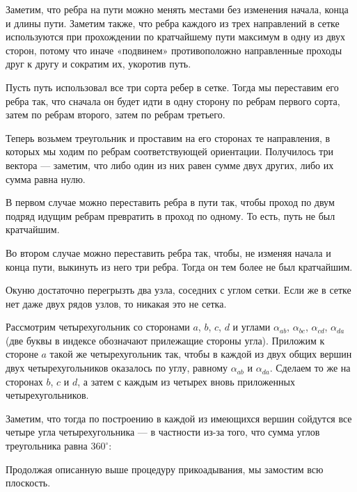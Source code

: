 ﻿
\begin{itemize}

\itA Заметим, что ребра на пути можно менять местами без изменения начала, конца и длины пути. Заметим также, что ребра каждого из трех направлений в сетке используются при прохождении по кратчайшему пути максимум в одну из двух сторон, потому что иначе «подвинем» противоположно направленные проходы друг к другу и сократим их, укоротив путь.

Пусть путь использовал все три сорта ребер в сетке. Тогда мы переставим его ребра так, что сначала он будет идти в одну сторону по ребрам первого сорта, затем по ребрам второго, затем по ребрам третьего.

Теперь возьмем треугольник и проставим на его сторонах те направления, в которых мы ходим по ребрам соответствующей ориентации. Получилось три вектора — заметим, что либо один из них равен сумме двух других, либо их сумма равна нулю.

В первом случае можно переставить ребра в пути так, чтобы проход по двум подряд идущим ребрам превратить в проход по одному. То есть, путь не был кратчайшим.

Во втором случае можно переставить ребра так, чтобы, не изменяя начала и конца пути, выкинуть из него три ребра. Тогда он тем более не был кратчайшим.

\itB Окуню достаточно перегрызть два узла, соседних с углом сетки. Если же в сетке нет даже двух рядов узлов, то никакая это не сетка.

\itC Рассмотрим четырехугольник со сторонами $a$, $b$, $c$, $d$ и углами $\alpha_{ab}$, $\alpha_{bc}$, $\alpha_{cd}$, $\alpha_{da}$ (две буквы в индексе обозначают прилежащие стороны угла). Приложим к стороне $a$ такой же четырехугольник так, чтобы в каждой из двух общих вершин двух четырехугольников оказалось по углу, равному $\alpha_{ab}$ и $\alpha_{da}$. Сделаем то же на сторонах $b$, $c$ и $d$, а затем с каждым из четырех вновь приложенных четырехугольников.

Заметим, что тогда по построению в каждой из имеющихся вершин сойдутся все четыре угла четырехугольника — в частности из-за того, что сумма углов треугольника равна $360^\circ$:

\begin{center}  \end{center}

Продолжая описанную выше процедуру прикоадывания, мы замостим всю плоскость.
\end{itemize}